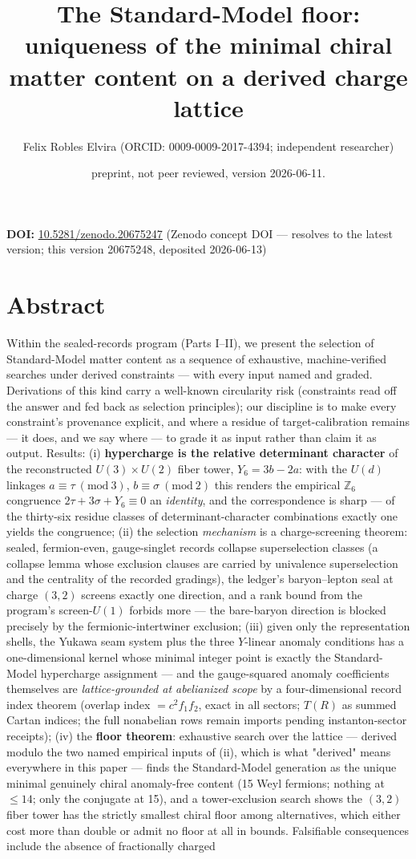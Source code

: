 \documentclass[11pt]{article}
\title{The Standard-Model floor: uniqueness of the minimal chiral matter content on a derived charge lattice}
\author{Felix Robles Elvira (ORCID: 0009-0009-2017-4394; independent researcher)}
\date{\small preprint, not peer reviewed, version 2026-06-11.}
\begin{document}
\maketitle

\textbf{DOI:} \href{https://doi.org/10.5281/zenodo.20675247}{10.5281/zenodo.20675247} (Zenodo concept DOI — resolves to the latest version; this version 20675248, deposited 2026-06-13)

\section*{Abstract}
Within the sealed-records program (Parts I–II), we present the selection of Standard-Model matter content as a sequence of exhaustive, machine-verified searches under derived constraints — with every input named and graded.  Derivations of this kind carry a well-known circularity risk (constraints read off the answer and fed back as selection principles); our discipline is to make every constraint's provenance explicit, and where a residue of target-calibration remains — it does, and we say where — to grade it as input rather than claim it as output.  Results: (i) \textbf{hypercharge is the relative determinant character} of the reconstructed $U(3)\times U(2)$ fiber tower, $Y_6 = 3b - 2a$: with the $U(d)$ linkages $a \equiv \tau \ (\mathrm{mod}\ 3)$, $b \equiv \sigma\ (\mathrm{mod}\ 2)$ this renders the empirical $\mathbb Z_6$ congruence $2\tau + 3\sigma + Y_6 \equiv 0$ an \emph{identity}, and the correspondence is sharp — of the thirty-six residue classes of determinant-character combinations exactly one yields the congruence; (ii) the selection \emph{mechanism} is a charge-screening theorem: sealed, fermion-even, gauge-singlet records collapse superselection classes (a collapse lemma whose exclusion clauses are carried by univalence superselection and the centrality of the recorded gradings), the ledger's baryon–lepton seal at charge $(3,2)$ screens exactly one direction, and a rank bound from the program's screen-$U(1)$ forbids more — the bare-baryon direction is blocked precisely by the fermionic-intertwiner exclusion; (iii) given only the representation shells, the Yukawa seam system plus the three $Y$-linear anomaly conditions has a one-dimensional kernel whose minimal integer point is exactly the Standard-Model hypercharge assignment — and the gauge-squared anomaly coefficients themselves are \emph{lattice-grounded at abelianized scope} by a four-dimensional record index theorem (overlap index $= c^2 f_1 f_2$, exact in all sectors; $T(R)$ as summed Cartan indices; the full nonabelian rows remain imports pending instanton-sector receipts); (iv) the \textbf{floor theorem}: exhaustive search over the lattice — derived modulo the two named empirical inputs of (ii), which is what "derived" means everywhere in this paper — finds the Standard-Model generation as the unique minimal genuinely chiral anomaly-free content (15 Weyl fermions; nothing at $\le 14$; only the conjugate at 15), and a tower-exclusion search shows the $(3,2)$ fiber tower has the strictly smallest chiral floor among alternatives, which either cost more than double or admit no floor at all in bounds.  Falsifiable consequences include the absence of fractionally charged 
\end{document}
